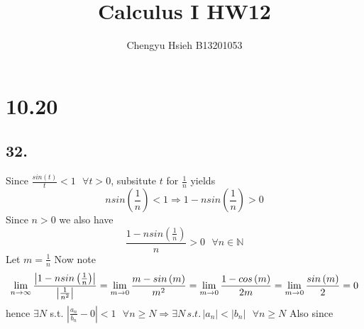 \documentclass[12pt]{article}
\title{Calculus I HW12}
\author{Chengyu Hsieh B13201053}
\begin{document}
\maketitle
\newpage
\section*{10.20}
\subsection*{32.}
Since $\frac{sin(t)}{t} < 1 \,\,\,\, \forall t>0$, subsitute $t$ for $\frac{1}{n}$ yields
\begin{equation*}
    nsin(\frac{1}{n})<1 \Rightarrow 1-n sin(\frac{1}{n})>0
\end{equation*}
Since $n>0$ we also have
\begin{equation*}
    \frac{1-nsin(\frac{1}{n})}{n}>0 \,\,\,\, \forall n \in \mathbb{N}
\end{equation*}
Let $m = \frac{1}{n}$
Now note
\begin{equation*}
\lim_{n \to \infty} \frac{\left| 1-nsin \left( \frac{1}{n} \right) \right|}{\left| \frac{1}{n^2} \right|} \\
= \lim_{m \to 0} \frac{m-sin \left( m \right)}{m^2} \\
= \lim_{m \to 0} \frac{1-cos \left( m \right)}{2m} \\
= \lim_{m \to 0} \frac{sin \left( m \right)}{2} = 0
\end{equation*}
hence $\exists N$ s.t. $\left| \frac{a_{n}}{b_{n}} - 0 \right| < 1 \,\,\,\, \forall n \ge N \Rightarrow \exists N \, s.t. \, |a_{n}| < |b_{n}|\,\,\,\, \forall n \ge N$ 
Also since 
\end{document}
